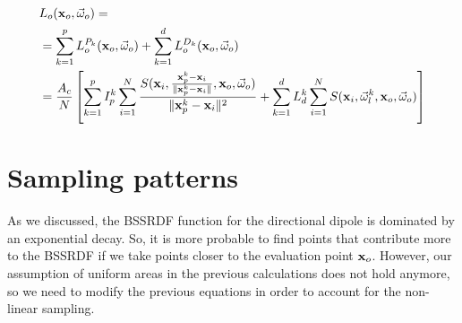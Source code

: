 \begin{equation}
\begin{split}
&L_o(\mathbf{x}_o,\vec{\omega}_o) = \\
&= \sum_{k=1}^{p}L_o^{P_k}(\mathbf{x}_o,\vec{\omega}_o) + \sum_{k=1}^{d}L_o^{D_k}(\mathbf{x}_o,\vec{\omega}_o) \\
&= \frac{A_c}{N} \left[ \sum_{k=1}^{p}I_p^k \sum_{i = 1}^N \frac{S(\mathbf{x}_i, \frac{\mathbf{x}_p^k - \mathbf{x}_i}{\|\mathbf{x}_p^k - \mathbf{x}_i\|}, \mathbf{x}_o, \vec{\omega}_o)}{\|\mathbf{x}_p^k - \mathbf{x}_i\|^2} + \sum_{k=1}^{d} L_d^k \sum_{i = 1}^N S(\mathbf{x}_i, \vec{\omega}^k_l, \mathbf{x}_o, \vec{\omega}_o) \right] 
\end{split}
\label{eq:inter4}
\end{equation}

\section{Sampling patterns}
\label{sec:patterns}
As we discussed, the BSSRDF function for the directional dipole is dominated by an exponential decay. So, it is more probable to find points that contribute more to the BSSRDF if we take points closer to the evaluation point $\mathbf{x}_o$. However, our assumption of uniform areas in the previous calculations does not hold anymore, so we need to modify the previous equations in order to account for the non-linear sampling.

